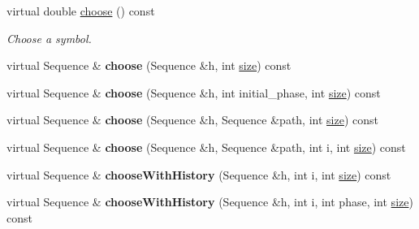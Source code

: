 \begin{DoxyCompactItemize}
virtual double \hyperlink{classtops_1_1ProbabilisticModel_a861d4381848b9e8d5794d546fd145599}{choose} () const
\begin{DoxyCompactList}\small\item\em Choose a symbol. \end{DoxyCompactList}\item 
\mbox{\label{classtops_1_1ProbabilisticModel_a00ccd90f44ba06d2419011947aa0a44c}} 
virtual Sequence \& {\bfseries choose} (Sequence \&h, int \hyperlink{classtops_1_1ProbabilisticModel_a4e3910e9b9b848b7078e7101909ae82a}{size}) const
\item 
\mbox{\label{classtops_1_1ProbabilisticModel_a2fb9f5efd989dca9bbfe5606dcf1ca8d}} 
virtual Sequence \& {\bfseries choose} (Sequence \&h, int initial\+\_\+phase, int \hyperlink{classtops_1_1ProbabilisticModel_a4e3910e9b9b848b7078e7101909ae82a}{size}) const
\item 
\mbox{\label{classtops_1_1ProbabilisticModel_abff09b1fae1a63c8af61c66219dc08c4}} 
virtual Sequence \& {\bfseries choose} (Sequence \&h, Sequence \&path, int \hyperlink{classtops_1_1ProbabilisticModel_a4e3910e9b9b848b7078e7101909ae82a}{size}) const
\item 
\mbox{\label{classtops_1_1ProbabilisticModel_a321b0383ae7e08f7070d1334f24c9122}} 
virtual Sequence \& {\bfseries choose} (Sequence \&h, Sequence \&path, int i, int \hyperlink{classtops_1_1ProbabilisticModel_a4e3910e9b9b848b7078e7101909ae82a}{size}) const
\item 
\mbox{\label{classtops_1_1ProbabilisticModel_a05c51b45ddd2430eb03a0331f7855b80}} 
virtual Sequence \& {\bfseries choose\+With\+History} (Sequence \&h, int i, int \hyperlink{classtops_1_1ProbabilisticModel_a4e3910e9b9b848b7078e7101909ae82a}{size}) const
\item 
\mbox{\label{classtops_1_1ProbabilisticModel_ad37b3f08436f2ebfa98409e627c44558}} 
virtual Sequence \& {\bfseries choose\+With\+History} (Sequence \&h, int i, int phase, int \hyperlink{classtops_1_1ProbabilisticModel_a4e3910e9b9b848b7078e7101909ae82a}{size}) const
\item 

\end{DoxyCompactItemize}
